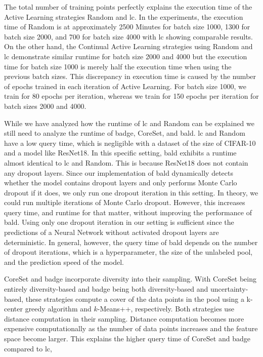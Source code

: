 The total number of training points perfectly explains the execution time of the Active Learning strategies Random and \gls{lc}. In the experiments,
the execution time of Random is at approximately 2500 Minutes for batch size 1000, 1300 for batch size 2000, and 700 for batch size 4000 with \gls{lc}
showing comparable results. On the other hand, the Continual Active Learning strategies using Random and \gls{lc} demonstrate similar runtime for batch size
2000 and 4000 but the execution time for batch size 1000 is merely half the execution time when using the previous batch sizes. This discrepancy in
execution time is caused by the number of epochs trained in each iteration of Active Learning. For batch size 1000, we train for 80 epochs per
iteration, whereas we train for 150 epochs per iteration for batch sizes 2000 and 4000. \par
While we have analyzed how the runtime of \gls{lc} and Random can be explained we still need to analyze the runtime of \gls{badge}, CoreSet, and \gls{bald}.
\gls{lc} and Random have a low query time, which is negligible with a dataset of the size of CIFAR-10 and a model like ResNet18. In this specific
setting, \gls{bald} exhibits a runtime almost identical to \gls{lc} and Random. This is because ResNet18 does not contain any dropout layers.
Since our implementation of \gls{bald} dynamically detects whether the model contains dropout layers and only performs Monte Carlo dropout if it does,
we only run one dropout iteration in this setting. In theory, we could run multiple iterations of Monte Carlo dropout. However, this increases query time,
and runtime for that matter, without improving the performance of \gls{bald}. Using only one dropout iteration in our setting is sufficient since the
predictions of a Neural Network without activated dropout layers are deterministic. In general, however, the query time of \gls{bald} depends on the number
of dropout iterations, which is a hyperparameter, the size of the unlabeled pool, and the prediction speed of the model. \par
CoreSet and \gls{badge} incorporate diversity into their sampling. With CoreSet being entirely diversity-based and
\gls{badge} being both diversity-based and uncertainty-based, these strategies compute a cover of the data points in the pool using a k-center greedy
algorithm and $k$-Means++, respectively. Both strategies use distance computation in their sampling. Distance computation becomes more expensive computationally
as the number of data points increases and the feature space become larger. This explains the higher query time of CoreSet and \gls{badge} compared to \gls{lc},
